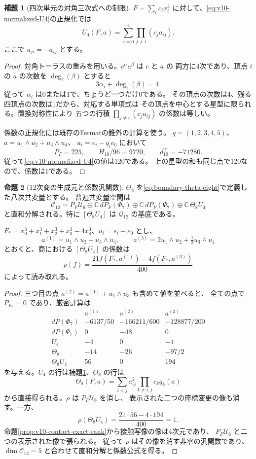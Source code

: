 \documentclass[a4paper,11pt]{ltjsarticle}
\theoremstyle{definition}
\newtheorem{theorem}{命題}[section]
\newtheorem{lemma}[theorem]{補題}
\newcommand{\CC}{\mathbb C}
\begin{document}
\begin{lemma}[四次単元の対角三次式への制限]
\label{lem:v10-U4-diagonal}
$F=\sum_i c_i x_i^3$ に対して、\eqref{eq:v10-normalized-U4}の正規化では
\[
 U_4(F,a)=\sum_{i=0}^4\prod_{j\ne i}(c_j a_{ij}).
\]
ここで $a_{ji}=-a_{ij}$ とする。
\end{lemma}
\begin{proof}
対角トーラスの重みを用いる。$c^\alpha a^\beta$ は $c$ と $a$ の
両方に4次であり、頂点 $i$ の $a$ の次数を $\deg_i(\beta)$ とすると
\[
 3\alpha_i+\deg_i(\beta)=4.
\]
従って $\alpha_i$ は0または1で、ちょうど一つだけ0である。
その頂点の次数は4、残る四頂点の次数は1だから、対応する単項式は
その頂点を中心とする星型に限られる。置換対称性により
五つの行積 $\prod_{j\ne i}(c_j a_{ij})$ の係数は等しい。

係数の正規化には既存のFermatの錐外の計算を使う。
$q=(1,2,3,4,5)$、$a=u_1\wedge u_2+u_3\wedge u_4$、
$u_i=e_i-q_i e_0$ において
\[
 P_F=225,\qquad H_{10}/96=9720,\qquad
 d^{\mathrm T}_{10}=-71280.
\]
従って\eqref{eq:v10-normalized-U4}の値は120である。
上の星型の和も同じ点で120なので、係数は1である。
\end{proof}

\begin{theorem}[12次商の生成元と係数汎関数]
\label{thm:v10-twelfth-generator}
$\Theta_8$ を\eqref{eq:boundary-theta-eight}で定義した八次共変量とする。
普遍共変量空間は
\[
 \mathcal C_{12}
 =P_F\mathcal U_6
   \oplus\CC\,dP_F(\Phi_7)
   \oplus\CC\,dP_F(\Psi_7)
   \oplus\CC\,\Theta_8U_4
\]
と直和分解される。特に $[\Theta_8U_4]$ は $\mathcal Q_{12}$ の基底である。

$F_*=x_0^3+x_1^3+x_2^3+x_3^3-4x_4^3$、$u_i=e_i-e_0$ とし、
\[
 a^{(1)}=u_1\wedge u_2+u_3\wedge u_4,\qquad
 a^{(3)}=2u_1\wedge u_2+\tfrac12u_3\wedge u_4
\]
とおくと、商における $[\Theta_8U_4]$ の係数は
\begin{equation}\label{eq:v10-rho-functional}
 \rho(f)=\frac{21f(F_*,a^{(1)})-4f(F_*,a^{(3)})}{400}
\end{equation}
によって読み取れる。
\end{theorem}
\begin{proof}
三つ目の点 $a^{(2)}=a^{(1)}+u_1\wedge u_3$ も含めて値を並べると、
全ての点で $P_{F_*}=0$ であり、厳密計算は
\[
\begin{array}{c|rrr}
 &a^{(1)}&a^{(2)}&a^{(3)}\\\hline
 dP(\Phi_7)&-6137/50&-166211/600&-128877/200\\
 dP(\Psi_7)&0&-48&0\\
 U_4&-4&0&-4\\
 \Theta_8&-14&-26&-97/2\\
 \Theta_8U_4&56&0&194
\end{array}
\]
を与える。$U_4$ の行は補題\ref{lem:v10-U4-diagonal}、$\Theta_8$ の行は
\[
 \Theta_8(F,a)=\sum_{i<j}a_{ij}^2\prod_{k\ne i,j}c_kq_k(a)
\]
から直接得られる。$\rho$ は $P_F\mathcal U_6$ を消し、
表示された二つの座標変更の像も消す。一方、
\[
 \rho(\Theta_8U_4)=\frac{21\cdot56-4\cdot194}{400}=1.
\]
命題\ref{prop:v10-contact-exact-rank}から接触写像の像は4次元であり、
$P_F\mathcal U_6$ と二つの表示された像で張られる。
従って $\rho$ はその像を消す非零の汎関数であり、
$\dim\mathcal C_{12}=5$ と合わせて直和分解と係数公式を得る。
\end{proof}
\end{document}
